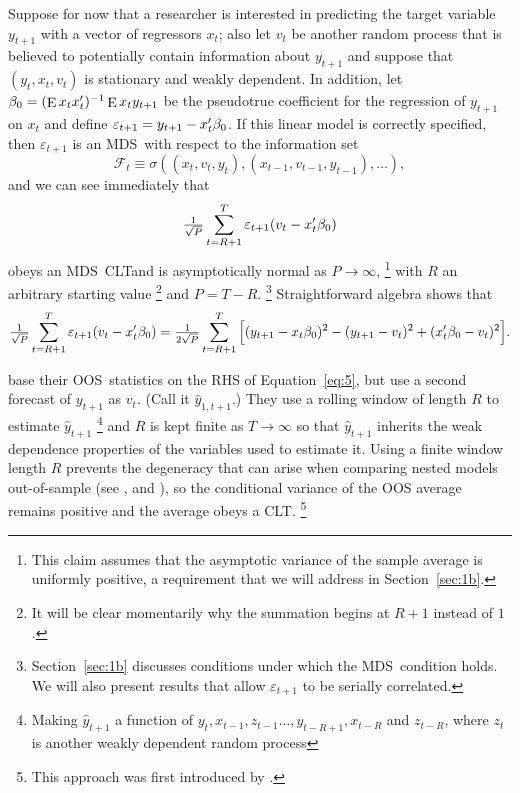 \documentclass[12pt,fleqn]{article}
\theoremstyle{definition}
\DeclareMathOperator{\E}{E}
\newcommand{\btrue}[1][]{\if#1*\hat\beta_{T+1}\else\beta_0\fi}
\newcommand{\ep}{\varepsilon}
\newcommand{\yh}{\hat{y}}
\newcommand{\osum}[1]{\sum_{#1=R+1}^T}
\newcommand{\oclt}[1]{\tfrac{1}{\sqrt{P}} \osum{#1}}
\newcommand{\clt}{CLT}
\newcommand{\mds}{MDS}
\newcommand{\oos}{OOS}
\begin{document}
Suppose for now that a researcher is interested in
predicting the target variable $y_{t+1}$ with a vector of regressors
$x_t$; also let $v_t$ be another random process that is believed to
potentially contain information about $y_{t+1}$ and suppose that
$(y_t, x_t, v_t)$ is stationary and weakly dependent.
In addition,
let $\btrue = (\E x_t x_t')^{-1} \E x_t y_{t+1}$ be the pseudotrue
coefficient for the regression of $y_{t+1}$ on $x_t$ and define
$\ep_{t+1} = y_{t+1} - x_t'\btrue$.  If this linear model is
correctly specified, then $\ep_{t+1}$ is an \mds\ with respect
to the information set
\begin{equation*}
\mathcal{F}_t \equiv \sigma((x_t, v_t, y_t), (x_{t-1}, v_{t-1},
y_{t-1}),\dots),
\end{equation*}
and we can see immediately that
\begin{equation}
  \label{eq:4}
  \oclt{t} \ep_{t+1} (v_t - x_t'\btrue)
\end{equation}
obeys an \mds\ \clt and is asymptotically normal as $P \to \infty$,%
\footnote{This claim assumes that the asymptotic variance of the
  sample average is uniformly positive, a requirement that we will
  address in Section~\ref{sec:1b}.} %
with $R$ an arbitrary starting value%
\footnote{It will be clear momentarily why the summation begins at
  $R+1$ instead of $1$.} %
and $P = T - R$.%
\footnote{Section~\ref{sec:1b} discusses conditions under which the
  \mds\ condition holds. We will also present results that allow
  $\ep_{t+1}$ to be serially correlated.} %
Straightforward algebra \citep{ClW:07} shows that
\begin{equation}
  \label{eq:5}
  \tfrac{1}{\sqrt{P}} \osum{t} \ep_{t+1} (v_t -
  x_t'\btrue) = \tfrac{1}{2 \sqrt{P}} \osum{t} \Big[(y_{t+1} -
  x_t\btrue)^2 - (y_{t+1} - v_t)^2 + (x_t'\btrue - v_t)^2 \Big].
\end{equation}

\citet{ClW:06,ClW:07} base their \oos\ statistics on the RHS of
Equation~\eqref{eq:5}, but use a second forecast of $y_{t+1}$ as
$v_t$. (Call it $\yh_{1,t+1}$.) They use a rolling window of length
$R$ to estimate $\yh_{t+1}$%
\footnote{Making $\yh_{t+1}$ a function of $y_t, x_{t-1}, z_{t-1}
\dots, y_{t-R+1}, x_{t-R}$ and $z_{t-R}$, where $z_t$ is another weakly
dependent random process} %
and $R$ is kept finite as $T \to \infty$ so that
$\yh_{t+1}$ inherits the weak dependence properties of the
variables used to estimate it. Using a finite window length $R$ prevents
the degeneracy that can arise when comparing nested models out-of-sample (see
\citealp{ClM:01}, and \citealp{Mcc:07}), so the conditional variance
of the OOS average remains positive and the average obeys a \clt.%
\footnote{This approach was first introduced by \citet{GiW:06}.} %
\end{document}
